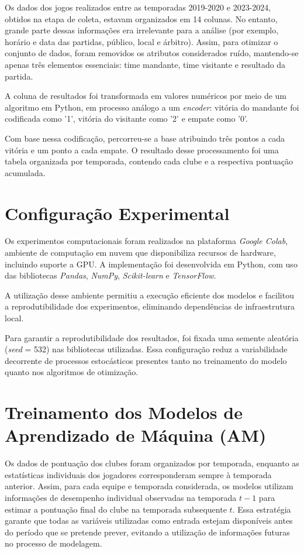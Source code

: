 Os dados dos jogos realizados entre as temporadas 2019-2020 e 2023-2024, obtidos na etapa de coleta, estavam organizados em 14 colunas. No entanto, 
grande parte dessas informações era irrelevante para a análise (por exemplo, horário e data das partidas, público, local e árbitro). 
Assim, para otimizar o conjunto de dados, foram removidos os atributos considerados ruído, mantendo-se apenas três elementos essenciais: time mandante, 
time visitante e resultado da partida.

A coluna de resultados foi transformada em valores numéricos por meio de um algoritmo em Python, em processo análogo a um \textit{encoder}: 
vitória do mandante foi codificada como '1', vitória do visitante como '2' e empate como '0'.

Com base nessa codificação, percorreu-se a base atribuindo três pontos a cada vitória e um ponto a cada empate. 
O resultado desse processamento foi uma tabela organizada por temporada, contendo cada clube e a respectiva pontuação acumulada.

\section{Configuração Experimental}

Os experimentos computacionais foram realizados na plataforma \textit{Google Colab}, 
ambiente de computação em nuvem que disponibiliza recursos de hardware, 
incluindo suporte a GPU. A implementação foi desenvolvida em Python, com uso 
das bibliotecas \textit{Pandas}, \textit{NumPy}, \textit{Scikit-learn} 
e \textit{TensorFlow}.

A utilização desse ambiente permitiu a execução eficiente dos 
modelos e facilitou a reprodutibilidade dos experimentos, eliminando 
dependências de infraestrutura local.

Para garantir a reprodutibilidade dos resultados, foi fixada uma semente 
aleatória (\textit{seed} = 532) nas bibliotecas utilizadas. Essa configuração 
reduz a variabilidade decorrente de processos estocásticos presentes tanto 
no treinamento do modelo quanto nos algoritmos de otimização.

\section{Treinamento dos Modelos de Aprendizado de Máquina (AM)}

Os dados de pontuação dos clubes foram organizados por temporada, enquanto as estatísticas individuais dos jogadores corresponderam sempre à temporada anterior. 
Assim, para cada equipe e temporada considerada, os modelos utilizam informações de desempenho individual observadas na temporada $t-1$ para estimar a pontuação 
final do clube na temporada subsequente $t$. Essa estratégia garante que todas as variáveis utilizadas como entrada estejam disponíveis antes do período que se 
pretende prever, evitando a utilização de informações futuras no processo de modelagem.

